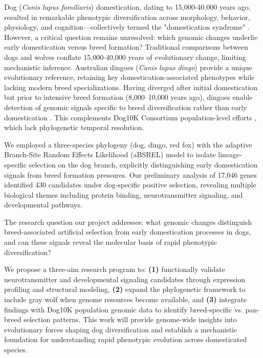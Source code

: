 \documentclass[11pt,letterpaper]{article}
\begin{document}
Dog (\textit{Canis lupus familiaris}) domestication, dating to 15,000-40,000 years ago, resulted in remarkable phenotypic diversification across morphology, behavior, physiology, and cognition—collectively termed the "domestication syndrome" \citep{Darwin1868, Belyaev1979, Wilkins2014, Freedman2014, Frantz2016}. However, a critical question remains unresolved: which genomic changes underlie early domestication versus breed formation? Traditional comparisons between dogs and wolves conflate 15,000-40,000 years of evolutionary change, limiting mechanistic inference. Australian dingoes (\textit{Canis lupus dingo}) provide a unique evolutionary reference, retaining key domestication-associated phenotypes while lacking modern breed specializations. Having diverged after initial domestication but prior to intensive breed formation (8,000–10,000 years ago), dingoes enable detection of genomic signals specific to breed diversification rather than early domestication \citep{Cairns2022, Savolainen2004}. This complements Dog10K Consortium population-level efforts \citep{Dog10K2023, Dog10K2024}, which lack phylogenetic temporal resolution.

We employed a three-species phylogeny (dog, dingo, red fox) with the adaptive Branch-Site Random Effects Likelihood (aBSREL) model \citep{Smith2015} to isolate lineage-specific selection on the dog branch, explicitly distinguishing early domestication signals from breed formation pressures. Our preliminary analysis of 17,046 genes identified 430 candidates under dog-specific positive selection, revealing multiple biological themes including protein binding, neurotransmitter signaling, and developmental pathways.

The research question our project addresses: what genomic changes distinguish breed-associated artificial selection from early domestication processes in dogs, and can these signals reveal the molecular basis of rapid phenotypic diversification?

We propose a three-aim research program to: \textbf{(1)} functionally validate neurotransmitter and developmental signaling candidates through expression profiling and structural modeling, \textbf{(2)} expand the phylogenetic framework to include gray wolf when genome resources become available, and \textbf{(3)} integrate findings with Dog10K population genomic data to identify breed-specific vs. pan-breed selection patterns. This work will provide genome-wide insights into evolutionary forces shaping dog diversification and establish a mechanistic foundation for understanding rapid phenotypic evolution across domesticated species.
\end{document}
